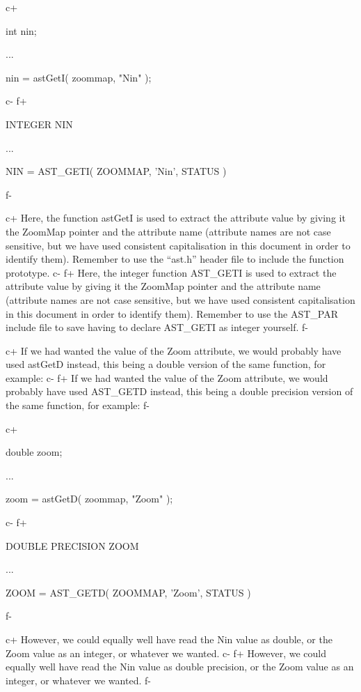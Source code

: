 \documentclass[twoside,11pt]{starlink}
\begin{document}
c+
\small
\begin{terminalv}
int nin;

...

nin = astGetI( zoommap, "Nin" );
\end{terminalv}
\normalsize
c-
f+
\small
\begin{terminalv}
      INTEGER NIN

      ...

      NIN = AST_GETI( ZOOMMAP, 'Nin', STATUS )
\end{terminalv}
\normalsize
f-

c+
Here, the function astGetI is used to extract the attribute value by
giving it the ZoomMap pointer and the attribute name (attribute names
are not case sensitive, but we have used consistent capitalisation in
this document in order to identify them). Remember to use the
``ast.h'' header file to include the function prototype.
c-
f+
Here, the integer function AST\_GETI is used to extract the attribute
value by giving it the ZoomMap pointer and the attribute name
(attribute names are not case sensitive, but we have used consistent
capitalisation in this document in order to identify them). Remember
to use the AST\_PAR include file to save having to declare AST\_GETI
as integer yourself.
f-

c+
If we had wanted the value of the Zoom attribute, we would probably
have used astGetD instead, this being a double version of the same
function, for example:
c-
f+
If we had wanted the value of the Zoom attribute, we would probably
have used AST\_GETD instead, this being a double precision version of
the same function, for example:
f-

c+
\small
\begin{terminalv}
double zoom;

...

zoom = astGetD( zoommap, "Zoom" );
\end{terminalv}
\normalsize
c-
f+
\small
\begin{terminalv}
      DOUBLE PRECISION ZOOM

      ...

      ZOOM = AST_GETD( ZOOMMAP, 'Zoom', STATUS )
\end{terminalv}
\normalsize
f-

c+
However, we could equally well have read the Nin value as double, or
the Zoom value as an integer, or whatever we wanted.
c-
f+
However, we could equally well have read the Nin value as double
precision, or the Zoom value as an integer, or whatever we wanted.
f-
\end{document}
